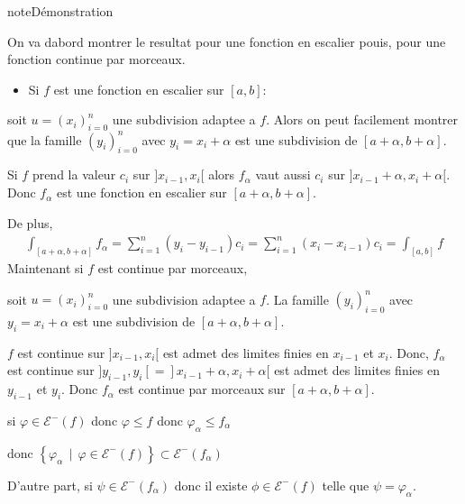\documentclass[letterpaper,10pt,french]{sphinxmanual}
\begin{document}
\begin{sphinxadmonition}{note}{Démonstration}

\sphinxAtStartPar
On va dabord montrer le resultat pour une fonction en escalier pouis, pour une fonction continue par morceaux.
\begin{itemize}
\item {} 
\sphinxAtStartPar
Si \(f\) est une fonction en escalier sur \([a, b]\):

\end{itemize}

\sphinxAtStartPar
soit \(u=(x_i)_{i=0}^n\) une subdivision adaptee a \(f\). Alors on peut facilement montrer que la famille \((y_i)_{i=0}^n\) avec \(y_i = x_i +\alpha\) est une subdivision de \([a+\alpha, b+\alpha]\).

\sphinxAtStartPar
Si \(f\) prend la valeur \(c_i\) sur \(]x_{i-1}, x_i[\) alors \(f_\alpha\) vaut aussi \(c_i\) sur \(]x_{i-1}+\alpha,  x_i+\alpha[\). Donc \(f_\alpha\) est une fonction en escalier sur \([a+\alpha, b+\alpha]\).

\sphinxAtStartPar
De plus,
\begin{equation*}
\begin{split}
\int_{[a+\alpha, b+\alpha]} f_\alpha = \sum_{i=1}^n (y_i - y_{i-1})c_i = \sum_{i=1}^n (x_i - x_{i-1})c_i = \int_{[a, b]} f
\end{split}
\end{equation*}
\sphinxAtStartPar
Maintenant si \(f\) est continue par morceaux,

\sphinxAtStartPar
soit \(u=(x_i)_{i=0}^n\) une subdivision adaptee a \(f\). La famille \((y_i)_{i=0}^n\) avec \(y_i = x_i +\alpha\) est une subdivision de \([a+\alpha, b+\alpha]\).

\sphinxAtStartPar
\(f\) est continue sur \(]x_{i-1}, x_i[\) est admet des limites finies en \(x_{i-1}\) et \(x_{i}\). Donc, \(f_\alpha\) est continue sur \(]y_{i-1}, y_i[=]x_{i-1}+\alpha, x_i+\alpha[\) est admet des limites finies en \(y_{i-1}\) et \(y_{i}\). Donc  \(f_\alpha\) est continue par morceaux sur \([a+\alpha, b+\alpha]\).

\sphinxAtStartPar
si \(\varphi \in \mathcal E^-(f)\) donc \(\varphi \leq f\) donc \(\varphi_\alpha  \leq f_\alpha\)

\sphinxAtStartPar
donc \(\left\{\varphi_\alpha ~~ | ~~ \varphi \in \mathcal E^-(f) \right\} \subset \mathcal E^-(f_\alpha)\)

\sphinxAtStartPar
D’autre part, si \(\psi \in  \mathcal E^-(f_\alpha)\) donc il existe \(\phi \in  \mathcal E^-(f)\) telle que \(\psi = \varphi_\alpha\).


\end{sphinxadmonition}
\end{document}
